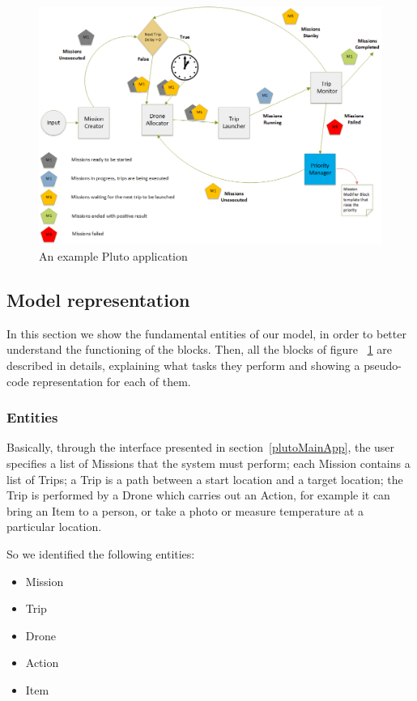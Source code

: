 \begin{figure}[htb]
  \centering
  \includegraphics[width=\linewidth]{pictures/BlocksDiagram.png}
  \caption{An example Pluto application}
  \label{fig:BlocksDiagram}
\end{figure}


\newpage
\subsection{Model representation}
\label{modelRepresentation}
In this section we show the fundamental entities of our model, in order to better understand the functioning of the blocks. Then, all the blocks of figure ~\ref{fig:BlocksDiagram} are described in details, explaining what tasks they perform and showing a pseudo-code representation for each of them.

\subsubsection {Entities}
\label{entities}

Basically, through the interface presented in section~\ref{plutoMainApp}, the user specifies a list of Missions that the system must perform; each Mission contains a list of Trips; a Trip is a path between a start location and a target location; the Trip is performed by a Drone which carries out an Action, for example it can bring an Item to a person, or take a photo or measure temperature at a particular location.

So we identified the following entities:

\begin{itemize}
\itemsep2pt
\item{
Mission
}
\item{
Trip
}
\item{
Drone
}
\item{
Action
}
\item{
Item
}
\end{itemize}

